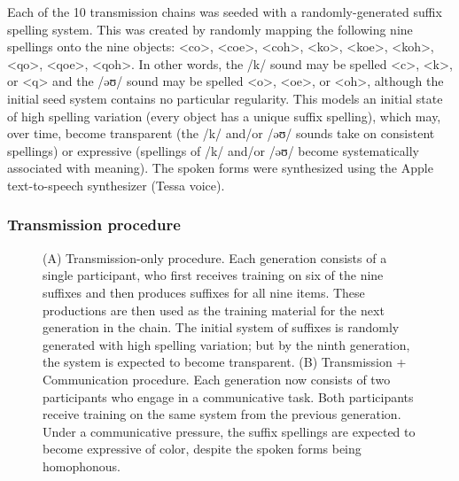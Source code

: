 \documentclass[doc,biblatex]{apa7}
\begin{document}
Each of the 10 transmission chains was seeded with a randomly-generated suffix spelling system. This was created by randomly mapping the following nine spellings onto the nine objects: <co>, <coe>, <coh>, <ko>, <koe>, <koh>, <qo>, <qoe>, <qoh>. In other words, the /k/ sound may be spelled <c>, <k>, or <q> and the /əʊ/ sound may be spelled <o>, <oe>, or <oh>, although the initial seed system contains no particular regularity. This models an initial state of high spelling variation (every object has a unique suffix spelling), which may, over time, become transparent (the /k/ and/or /əʊ/ sounds take on consistent spellings) or expressive (spellings of /k/ and/or /əʊ/ become systematically associated with meaning). The spoken forms were synthesized using the Apple text-to-speech synthesizer (Tessa voice).

\subsubsection{Transmission procedure}

	\begin{figure}
	\vspace*{2pt}
	\caption{(A) Transmission-only procedure. Each generation consists of a single participant, who first receives training on six of the nine suffixes and then produces suffixes for all nine items. These productions are then used as the training material for the next generation in the chain. The initial system of suffixes is randomly generated with high spelling variation; but by the ninth generation, the system is expected to become transparent. (B) Transmission + Communication procedure. Each generation now consists of two participants who engage in a communicative task. Both participants receive training on the same system from the previous generation. Under a communicative pressure, the suffix spellings are expected to become expressive of color, despite the spoken forms being homophonous.}
	\label{transmission}
	\end{figure}
\end{document}
